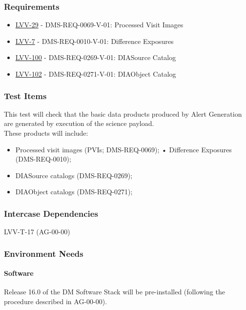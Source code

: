 \subsubsection{Requirements}
\begin{itemize}
\item \href{https://jira.lsstcorp.org/browse/LVV-29}{LVV-29} - DMS-REQ-0069-V-01: Processed Visit Images
\item \href{https://jira.lsstcorp.org/browse/LVV-7}{LVV-7} - DMS-REQ-0010-V-01: Difference Exposures
\item \href{https://jira.lsstcorp.org/browse/LVV-100}{LVV-100} - DMS-REQ-0269-V-01: DIASource Catalog
\item \href{https://jira.lsstcorp.org/browse/LVV-102}{LVV-102} - DMS-REQ-0271-V-01: DIAObject Catalog
\end{itemize}

\subsubsection{Test Items}
This test will check that the basic data products produced by Alert
Generation are generated by execution of the science payload.\\
These products will include:

\begin{itemize}
\tightlist
\item
  Processed visit images (PVIs; DMS-REQ-0069); • Difference Exposures
  (DMS-REQ-0010);
\item
  DIASource catalogs (DMS-REQ-0269);
\item
  DIAObject catalogs (DMS-REQ-0271);
\end{itemize}



\subsubsection{Intercase Dependencies}
LVV-T-17 (AG-00-00)


\subsubsection{Environment Needs}

\paragraph{Software}
Release 16.0 of the DM Software Stack will be pre-installed (following
the procedure described in AG-00-00).


